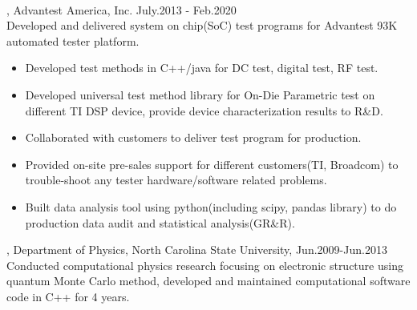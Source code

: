 \documentclass[11pt]{article} %
\begin{document}
\\
, Advantest America, Inc. July.2013 - Feb.2020\\
\noindent Developed and delivered system on chip(SoC) test programs for Advantest 93K automated tester platform.\\ 
\begin{itemize}
  
    \item Developed test methods in C++/java for DC test, digital test, RF test.\\
 \vspace{-4mm}
    \item  Developed universal test method library for On-Die Parametric test on different TI DSP device, provide device characterization results to R\&D.\\ 
 \vspace{-4mm}
  \item Collaborated with customers to deliver test program for production.\\
 \vspace{-4mm}
  \item Provided on-site pre-sales support for different customers(TI, Broadcom) to trouble-shoot any tester hardware/software related problems.\\ 
  \vspace{-4mm}
 \item  Built data analysis tool using python(including scipy, pandas library) to do production data audit and statistical analysis(GR\&R).

  
 \end{itemize}

, Department of Physics, North Carolina State University, Jun.2009-Jun.2013\\
\noindent Conducted computational physics research focusing on electronic structure using quantum Monte Carlo method, developed and maintained computational software code in C++ for 4 years.\\
\end{document}
